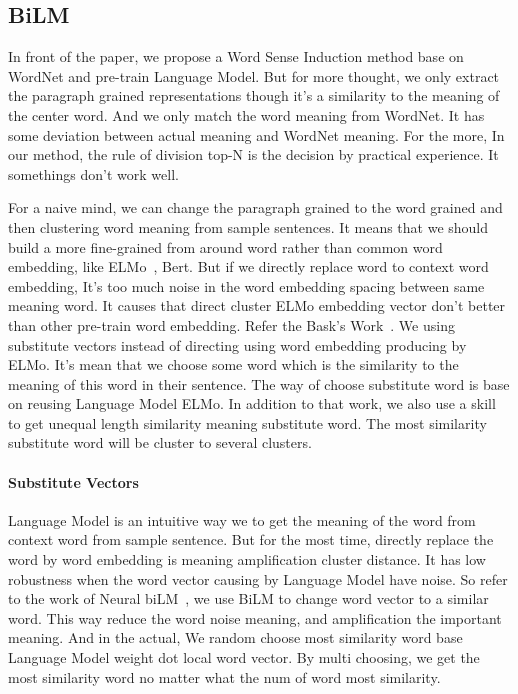 \subsection{BiLM}
\label{sec:bilm}

In front of the paper, we propose a Word Sense Induction method base on WordNet and pre-train Language Model.
But for more thought, we only extract the paragraph grained representations though it's a similarity to the meaning of the center word.
And we only match the word meaning from WordNet. It has some deviation between actual meaning and WordNet meaning.
For the more, In our method, the rule of division top-N is the decision by practical experience. It somethings don't work well.

For a naive mind, we can change the paragraph grained to the word grained and then clustering word meaning from sample sentences.
It means that we should build a more fine-grained from around word rather than common word embedding, like ELMo~\cite{Peters:2018}, Bert.
But if we directly replace word to context word embedding, It's too much noise in the word embedding spacing between same meaning word.
It causes that direct cluster ELMo embedding vector don't better than other pre-train word embedding.
Refer the Bask's Work~\cite{baskaya2013ai}. We using substitute vectors instead of directing using word embedding producing by ELMo.
It's mean that we choose some word which is the similarity to the meaning of this word in their sentence.
The way of choose substitute word is base on reusing Language Model ELMo.
In addition to that work, we also use a skill to get unequal length similarity meaning substitute word.
The most similarity substitute word will be cluster to several clusters. 

\paragraph{Substitute Vectors}
Language Model is an intuitive way we to get the meaning of the word from context word from sample sentence.
But for the most time, directly replace the word by word embedding is meaning amplification cluster distance.
It has low robustness when the word vector causing by Language Model have noise.
So refer to the work of Neural biLM~\cite{amrami-goldberg-2018-word}, we use BiLM to change word vector to a similar word.
This way reduce the word noise meaning, and amplification the important meaning.
And in the actual, We random choose most similarity word base Language Model weight dot local word vector.
By multi choosing, we get the most similarity word no matter what the num of word most similarity.

